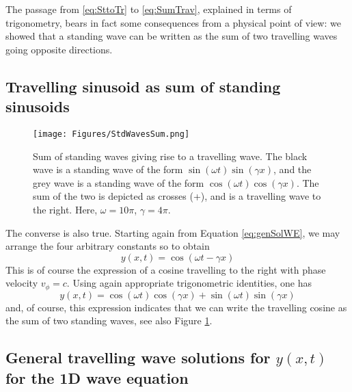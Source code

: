 The passage from \eqref{eq:SttoTr} to \eqref{eq:SumTrav}, explained in terms of trigonometry, bears in fact some consequences from a physical point of view: we showed that a standing wave can be written as the sum of two travelling waves going opposite directions. 

\subsection{Travelling sinusoid as sum of standing sinusoids}
\begin{figure}[hbt]
\texttt{[image: Figures/StdWavesSum.png]}
\caption{Sum of standing waves giving rise to a travelling wave. The black wave is a standing wave of the form $\sin(\omega t)\sin(\gamma x)$, and the grey wave is a standing wave of the form $\cos(\omega t)\cos(\gamma x)$. The sum of the two is depicted as crosses (+), and is a travelling wave to the right. Here, $\omega = 10\pi$, $\gamma = 4\pi$.}\label{fig:stdTrav}
\end{figure}
The converse is also true. Starting again from Equation \eqref{eq:genSolWE}, we may arrange the four arbitrary constants so to obtain
\begin{equation}
y(x,t) = \cos(\omega t - \gamma x)
\end{equation}
This is of course the expression of a cosine travelling to the right with phase velocity $v_\phi = c$. Using again appropriate trigonometric identities, one has
\begin{equation}
y(x,t) = \cos(\omega t)\cos(\gamma x) + \sin(\omega t)\sin(\gamma x)
\end{equation}
and, of course, this expression indicates that we can write the travelling cosine as the sum of two standing waves, see also Figure \ref{fig:stdTrav}. 





\subsection{General travelling wave solutions for $y(x,t)$ for the 1D wave equation}


